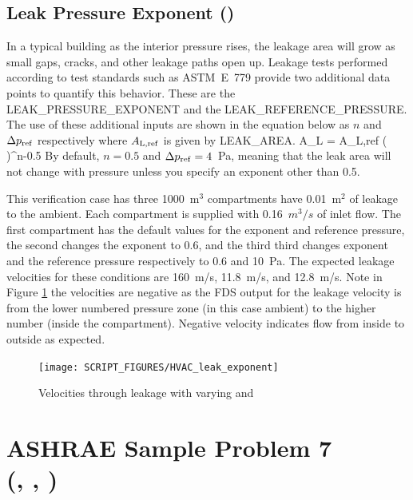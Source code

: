 \documentclass[11pt]{book}
\begin{document}
\subsection{Leak Pressure Exponent (\texorpdfstring{}{HVAC\_leak\_exponent})}
\label{HVAC_leak_exponent}

In a typical building as the interior pressure rises, the leakage area will grow as small gaps, cracks, and other leakage paths open up. Leakage tests performed according to test standards such as ASTM~E~779 provide two additional data points to quantify this behavior. These are the {\ct LEAK\_PRESSURE\_EXPONENT} and the {\ct LEAK\_REFERENCE\_PRESSURE}. The use of these additional inputs are shown in the equation below as $n$ and $\Delta p_{\rm ref}$ respectively where $A_{\rm L,ref}$ is given by {\ct LEAK\_AREA}.
\be  A_{\rm L} = A_{\rm L,ref} \left(  \right)^{n-0.5} \ee
By default, $n=0.5$ and $\Delta p_{\rm ref}=4$~Pa, meaning that the leak area will not change with pressure unless you specify an exponent other than 0.5.

This verification case has three 1000~m$^3$ compartments have 0.01~m$^2$ of leakage to the ambient. Each compartment is supplied with 0.16~$m^3/s$ of inlet flow. The first compartment has the default values for the exponent and reference pressure, the second changes the exponent to 0.6, and the third third changes exponent and the reference pressure respectively to 0.6 and 10~Pa. The expected leakage velocities for these conditions are 160~m/s, 11.8~m/s, and 12.8~m/s. Note in Figure \ref{leak_exponent_fig} the velocities are negative as the FDS output for the leakage velocity is from the lower numbered pressure zone (in this case ambient) to the higher number (inside the compartment). Negative velocity indicates flow from inside to outside as expected.

\begin{figure}[ht]
	\centering
	\texttt{[image: SCRIPT\_FIGURES/HVAC\_leak\_exponent]}
	\caption[The  case]{Velocities through leakage with varying  and }
	\label{leak_exponent_fig}
\end{figure}

\section{ASHRAE Sample Problem 7\\(\texorpdfstring{}{ashrae\_7\_fixed\_flow}, \texorpdfstring{}{ashrae\_7\_quadratic}, \texorpdfstring{}{ashrae\_7\_table})}
\label{ashrae7}
\label{ashrae7_fixed_flow}
\label{ashrae7_quadratic}
\label{ashrae7_table}
\end{document}
